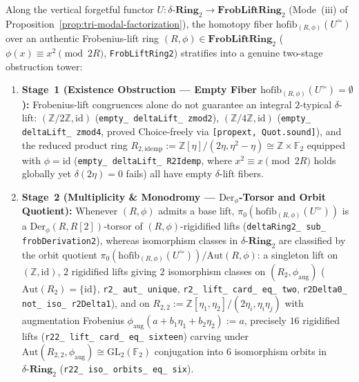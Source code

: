 \begin{proposition}\label{prop:delta-three-stage-tower}%
%
%
Along the vertical forgetful functor $U : \delta\text{-}\mathbf{Ring}_2 \to \mathbf{FrobLiftRing}_2$ (Mode~(iii) of Proposition~\ref{prop:tri-modal-factorization}), the homotopy fiber $\mathrm{hofib}_{(R,\phi)}(U^{\simeq})$ over an authentic Frobenius-lift ring $(R, \phi) \in \mathbf{FrobLiftRing}_2$ ($\phi(x) \equiv x^2 \pmod{2R}$, \texttt{FrobLiftRing2}) stratifies into a genuine two-stage obstruction tower:
\begin{enumerate}
  \item \textbf{Stage~1 (Existence Obstruction — Empty Fiber $\mathrm{hofib}_{(R,\phi)}(U^{\simeq}) = \emptyset$):} Frobenius-lift congruences alone do not guarantee an integral $2$-typical $\delta$-lift: $(\mathbb{Z}/2\mathbb{Z}, \mathrm{id})$ (\texttt{empty\_ deltaLift\_ zmod2}), $(\mathbb{Z}/4\mathbb{Z}, \mathrm{id})$ (\texttt{empty\_ deltaLift\_ zmod4}, proved Choice-freely via \texttt{[propext, Quot.sound]}), and the reduced product ring $R_{2,\mathrm{idemp}} := \mathbb{Z}[\eta]/(2\eta, \eta^2 - \eta) \cong \mathbb{Z} \times \mathbb{F}_2$ equipped with $\phi = \mathrm{id}$ (\texttt{empty\_ deltaLift\_ R2Idemp}, where $x^2 \equiv x \pmod{2R}$ holds globally yet $\delta(2\eta)=0$ fails) all have empty $\delta$-lift fibers.
  \item \textbf{Stage~2 (Multiplicity \& Monodromy — $\mathrm{Der}_\phi$-Torsor and Orbit Quotient):} Whenever $(R, \phi)$ admits a base lift, $\pi_0(\mathrm{hofib}_{(R,\phi)}(U^{\simeq}))$ is a $\mathrm{Der}_\phi(R, R[2])$-torsor of $(R,\phi)$-rigidified lifts (\texttt{deltaRing2\_ sub\_ frobDerivation2}), whereas isomorphism classes in $\delta\text{-}\mathbf{Ring}_2$ are classified by the orbit quotient $\pi_0(\mathrm{hofib}_{(R,\phi)}(U^{\simeq})) / \mathrm{Aut}(R,\phi)$: a singleton lift on $(\mathbb{Z}, \mathrm{id})$, $2$ rigidified lifts giving $2$ isomorphism classes on $(R_2, \phi_{\mathrm{aug}})$ ($\mathrm{Aut}(R_2) = \{\mathrm{id}\}$, \texttt{r2\_ aut\_ unique}, \texttt{r2\_ lift\_ card\_ eq\_ two}, \texttt{r2Delta0\_ not\_ iso\_ r2Delta1}), and on $R_{2,2} := \mathbb{Z}[\eta_1, \eta_2]/(2\eta_i, \eta_i\eta_j)$ with augmentation Frobenius $\phi_{\mathrm{aug}}(a + b_1\eta_1 + b_2\eta_2) := a$, precisely $16$ rigidified lifts (\texttt{r22\_ lift\_ card\_ eq\_ sixteen}) carving under $\mathrm{Aut}(R_{2,2}, \phi_{\mathrm{aug}}) \cong \mathrm{GL}_2(\mathbb{F}_2)$ conjugation into $6$ isomorphism orbits in $\delta\text{-}\mathbf{Ring}_2$ (\texttt{r22\_ iso\_ orbits\_ eq\_ six}).
\end{enumerate}
\end{proposition}

